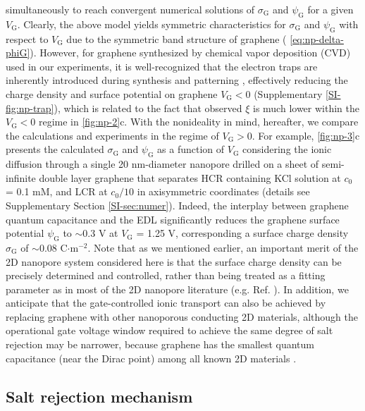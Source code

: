 simultaneously to reach convergent numerical solutions of
$\sigma_{\mathrm{G}}$ and $\psi_{\mathrm{G}}$ for a given
$V_{\mathrm{G}}$. Clearly, the above model yields symmetric
characteristics for $\sigma_{\mathrm{G}}$ and $\psi_{\mathrm{G}}$ with
respect to $V_{\mathrm{G}}$ due to the symmetric band structure of
graphene ( \autoref{eq:np-delta-phiG}). However, for graphene
synthesized by chemical vapor deposition (CVD) used in our
experiments, it is well-recognized that the electron traps are
inherently introduced during synthesis and patterning
\cite{Dean_2010_BN_gr_highquality}, effectively reducing the charge density and surface
potential on graphene $V_{\mathrm{G}}<0$ (Supplementary 
\autoref{SI-fig:np-trap}), which is related to the fact that observed $\xi$
is much lower within the $V_{\mathrm{G}}<0$ regime in 
\autoref{fig:np-2}c. With the nonideality in mind, hereafter, we compare the
calculations and experiments in the regime of $V_{\mathrm{G}}>0$. For
example,  \autoref{fig:np-3}c presents the calculated
$\sigma_{\mathrm{G}}$ and $\psi_{\mathrm{G}}$ as a function of
$V_{\mathrm{G}}$ considering the ionic diffusion through a single 20
nm-diameter nanopore drilled on a sheet of semi-infinite double layer
graphene that separates HCR containing KCl solution at $c_{0}$ = 0.1
mM, and LCR at $c_{0}/10$ in axisymmetric coordinates (details see
Supplementary Section \autoref{SI-sec:numer}). Indeed, the interplay
between graphene quantum capacitance and the EDL significantly reduces
the graphene surface potential $\psi_{\mathrm{G}}$ to $\sim$0.3 V at
$V_{\mathrm{G}}$ = 1.25 V, corresponding a surface charge density
$\sigma_{\mathrm{G}}$ of $\sim$0.08 C$\cdot$m$^{-2}$. Note that as we
mentioned earlier, an important merit of the 2D nanopore system
considered here is that the surface charge density can be precisely
determined and controlled, rather than being treated as a fitting
parameter as in most of the 2D nanopore literature
(e.g. Ref. \cite{Rollings_2016_gating}). In addition, we anticipate that
the gate-controlled ionic transport can also be achieved by replacing
graphene with other nanoporous conducting 2D materials, although the
operational gate voltage window required to achieve the same degree of
salt rejection may be narrower, because graphene has the smallest
quantum capacitance (near the Dirac point) among all known 2D
materials .

\subsection{Salt rejection mechanism}
\label{sec:mechanism}

